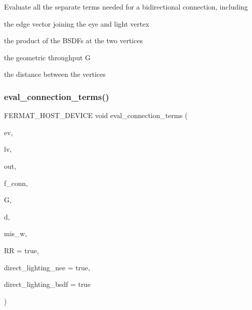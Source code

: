 \begin{DoxyParagraph}{}
Evaluate all the separate terms needed for a bidirectional connection, including ~\newline

\begin{DoxyItemize}
\item the edge vector joining the eye and light vertex
\item the product of the B\+S\+D\+Fs at the two vertices
\item the geometric throughput G
\item the distance between the vertices 
\end{DoxyItemize}
\end{DoxyParagraph}
\mbox{\label{group___b_p_t_lib_core_ga630c6ca6bd993457e69d47dda397e6a3}} 
\subsubsection{\texorpdfstring{eval\+\_\+connection\+\_\+terms()}{eval\_connection\_terms()}\hspace{0.1cm}{\footnotesize\ttfamily [2/3]}}
{\footnotesize\ttfamily F\+E\+R\+M\+A\+T\+\_\+\+H\+O\+S\+T\+\_\+\+D\+E\+V\+I\+CE void eval\+\_\+connection\+\_\+terms (\begin{DoxyParamCaption}\item[{const \hyperlink{struct_eye_vertex}{Eye\+Vertex}}]{ev,  }\item[{const \hyperlink{struct_light_vertex}{Light\+Vertex} \&}]{lv,  }\item[{\hyperlink{structcugar_1_1_vector}{cugar\+::\+Vector3f} \&}]{out,  }\item[{\hyperlink{structcugar_1_1_vector}{cugar\+::\+Vector3f} \&}]{f\+\_\+conn,  }\item[{float \&}]{G,  }\item[{float \&}]{d,  }\item[{float \&}]{mis\+\_\+w,  }\item[{bool}]{RR = {\ttfamily true},  }\item[{bool}]{direct\+\_\+lighting\+\_\+nee = {\ttfamily true},  }\item[{bool}]{direct\+\_\+lighting\+\_\+bsdf = {\ttfamily true} }\end{DoxyParamCaption})\hspace{0.3cm}{\ttfamily [inline]}}

